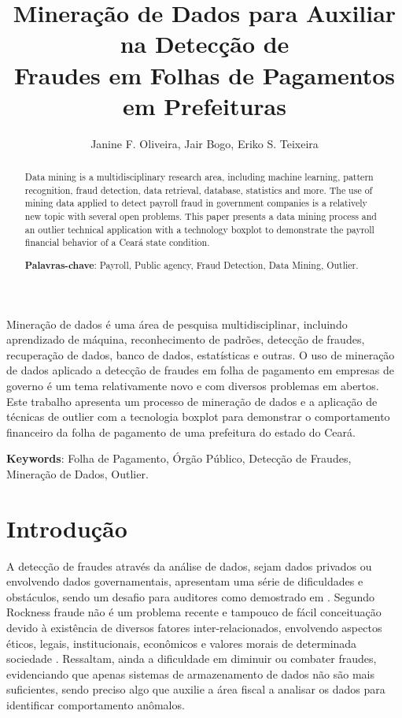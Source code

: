 \documentclass[12pt]{article}
\title{Mineração de Dados para Auxiliar na Detecção de 
\\Fraudes em Folhas de Pagamentos em Prefeituras}
\author{Janine F. Oliveira\inst{1}, Jair Bogo\inst{1}, Eriko S. Teixeira\inst{1,2}}
\begin{document}
 

\maketitle

\begin{abstract}
Data mining is a multidisciplinary research area, including machine learning, pattern recognition, fraud detection, data retrieval, database, statistics and more. The use of mining data applied to detect payroll fraud in government companies is a relatively new topic with several open problems. This paper presents a data mining process and an outlier technical application with a technology boxplot to demonstrate the payroll financial behavior of a Ceará state condition.
  
  \vspace{\onelineskip}
 \noindent
 \textbf{Palavras-chave}: Payroll, Public agency, Fraud Detection, Data Mining, Outlier.
\end{abstract}
     
\begin{resumo} 
 Mineração de dados é uma área de pesquisa multidisciplinar, incluindo aprendizado de máquina, reconhecimento de padrões, detecção de fraudes, recuperação de dados, banco de dados, estatísticas e outras. O uso de mineração de dados aplicado a detecção de fraudes em folha de pagamento em empresas de governo é um tema relativamente novo e com diversos problemas em abertos. Este trabalho apresenta um processo de mineração de dados e a aplicação de técnicas de outlier com a tecnologia boxplot para demonstrar o comportamento financeiro da folha de pagamento de uma prefeitura do estado do Ceará.
  
 \vspace{\onelineskip}
 \noindent
 \textbf{Keywords}: Folha de Pagamento, Órgão Público, Detecção de Fraudes, Mineração de Dados, Outlier.
\end{resumo}

\section{Introdução}
A detecção de fraudes através da análise de dados, sejam dados privados ou envolvendo dados governamentais, apresentam uma série de dificuldades e obstáculos, sendo um desafio para auditores como demostrado em \cite{ELECHI-2019}. Segundo Rockness fraude não é um problema recente e tampouco de fácil conceituação devido à existência de diversos fatores inter-relacionados, envolvendo aspectos éticos, legais, institucionais, econômicos e valores morais de determinada sociedade \cite{ROCKNESS-2005}. Ressaltam, ainda a dificuldade em diminuir ou combater fraudes, evidenciando que apenas sistemas de armazenamento de dados não são mais suficientes, sendo preciso algo que auxilie a área fiscal a analisar os dados para identificar comportamento anômalos.
\end{document}
